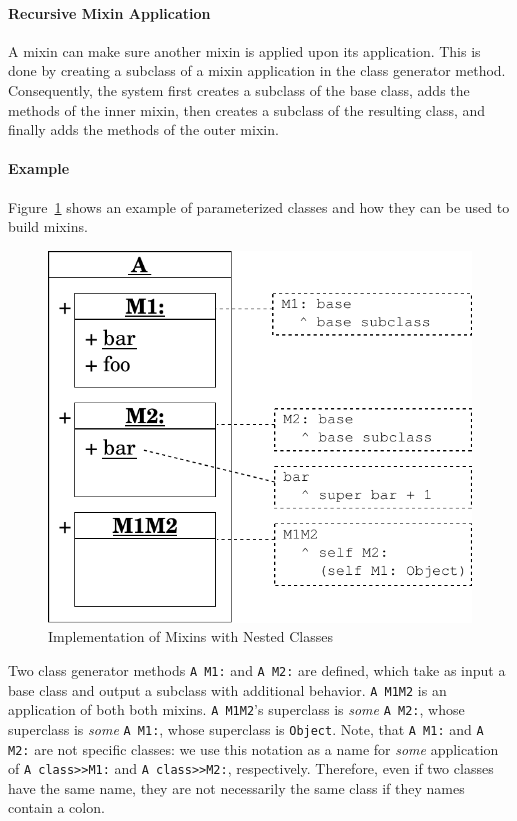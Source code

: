 \paragraph{Recursive Mixin Application}
A mixin can make sure another mixin is applied upon its application. This is done by creating a subclass of a mixin application in the class generator method. Consequently, the system first creates a subclass of the base class, adds the methods of the inner mixin, then creates a subclass of the resulting class, and finally adds the methods of the outer mixin.

\paragraph{Example}
Figure~\ref{fig:concept_mixins} shows an example of parameterized classes and how they can be used to build mixins.

\begin{figure}[!htp]
    \centering
    \includegraphics[scale=0.75]{nested_mixins.pdf}
    \caption{Implementation of Mixins with Nested Classes}
    \label{fig:concept_mixins}
\end{figure}

Two class generator methods \texttt{A M1:} and \texttt{A M2:} are defined, which take as input a base class and output a subclass with additional behavior. \texttt{A M1M2} is an application of both both mixins. \texttt{A M1M2}'s superclass is \emph{some} \texttt{A M2:}, whose superclass is \emph{some} \texttt{A M1:}, whose superclass is \texttt{Object}. Note, that \texttt{A M1:} and \texttt{A M2:} are not specific classes: we use this notation as a name for \emph{some} application of \texttt{A class>>M1:} and \texttt{A class>>M2:}, respectively. Therefore, even if two classes have the same name, they are not necessarily the same class if they names contain a colon.


